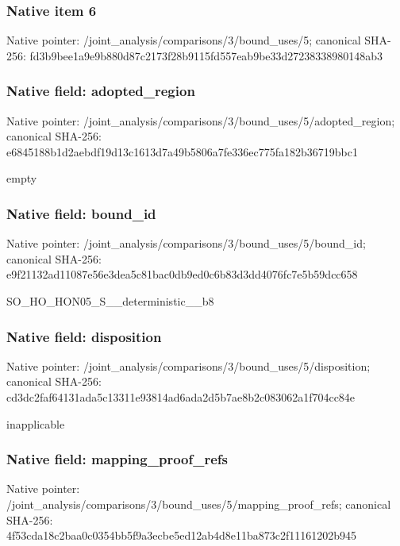 \documentclass[10pt,a4paper]{article}
\begin{document}
\subsubsection{Native item 6}
Native pointer: /joint\_\allowbreak{}analysis/comparisons/3/bound\_\allowbreak{}uses/5; canonical SHA-256: fd3b9bee1a9e9b880d87c2173f28b9115fd557eab9be33d27238338980148ab3

\subsubsection{Native field: adopted\_\allowbreak{}region}
Native pointer: /joint\_\allowbreak{}analysis/comparisons/3/bound\_\allowbreak{}uses/5/adopted\_\allowbreak{}region; canonical SHA-256: e6845188b1d2aebdf19d13c1613d7a49b5806a7fe336ec775fa182b36719bbc1

\begingroup\raggedright\sloppy empty\par\endgroup

\subsubsection{Native field: bound\_\allowbreak{}id}
Native pointer: /joint\_\allowbreak{}analysis/comparisons/3/bound\_\allowbreak{}uses/5/bound\_\allowbreak{}id; canonical SHA-256: e9f21132ad11087e56e3dea5c81bac0db9ed0c6b83d3dd4076fc7e5b59dcc658

\begingroup\raggedright\sloppy SO\_\allowbreak{}HO\_\allowbreak{}HON05\_\allowbreak{}S\_\allowbreak{}\_\allowbreak{}deterministic\_\allowbreak{}\_\allowbreak{}b8\par\endgroup

\subsubsection{Native field: disposition}
Native pointer: /joint\_\allowbreak{}analysis/comparisons/3/bound\_\allowbreak{}uses/5/disposition; canonical SHA-256: cd3dc2faf64131ada5c13311e93814ad6ada2d5b7ae8b2c083062a1f704cc84e

\begingroup\raggedright\sloppy inapplicable\par\endgroup

\subsubsection{Native field: mapping\_\allowbreak{}proof\_\allowbreak{}refs}
Native pointer: /joint\_\allowbreak{}analysis/comparisons/3/bound\_\allowbreak{}uses/5/mapping\_\allowbreak{}proof\_\allowbreak{}refs; canonical SHA-256: 4f53cda18c2baa0c0354bb5f9a3ecbe5ed12ab4d8e11ba873c2f11161202b945
\end{document}
